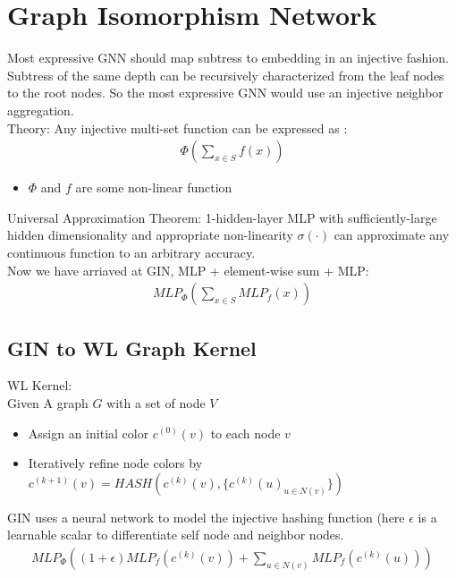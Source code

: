 \section{Graph Isomorphism Network} 
Most expressive GNN should map subtress to embedding in an injective fashion. Subtress of the same depth can be recursively characterized from the leaf nodes to the root nodes. So the most expressive GNN would use an injective neighbor aggregation. \\
Theory: Any injective multi-set function can be expressed as :  
    \begin{align*}
        \Phi(\sum_{x \in S} f(x))
    \end{align*}
    \begin{itemize}
        \item $\Phi$ and $f$ are some non-linear function 
    \end{itemize}
Universal Approximation Theorem: 1-hidden-layer MLP with sufficiently-large hidden dimensionality and appropriate non-linearity $\sigma(\cdot)$ can approximate any continuous function to an arbitrary accuracy. \\

Now we have arriaved at GIN, MLP + element-wise sum + MLP: 
    \begin{align*}
        MLP_\Phi (\sum_{x\in S} MLP_f(x))
    \end{align*}


\subsection{GIN to WL Graph Kernel} 
WL Kernel: \\
Given A graph $G$ with a set of node $V$
    \begin{itemize}
        \item Assign an initial color $c^{(0)}(v)$ to each node $v$
        \item Iteratively refine node colors by $c^{(k+1)}(v) = HASH \left(  c^{(k)}(v), \{ c^{(k)}(u)_{u \in N(v)}  \}  \right) $
    \end{itemize}
GIN uses a neural network to model the injective hashing function (here $\epsilon$ is a learnable scalar to differentiate self node and neighbor nodes.
    \begin{align*}
        MLP_\Phi \left( (1 + \epsilon)  MLP_f (c^{(k)}(v)) + \sum_{u\in N(v)} MLP_f (c^{(k)}(u)) \right)
    \end{align*}